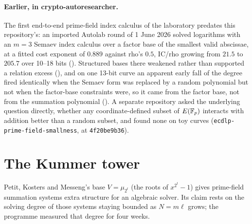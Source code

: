 \paragraph{Earlier, in crypto-autoresearcher.} The first end-to-end
prime-field index calculus of the laboratory predates this repository's:
an imported Autolab round of 1 June 2026 solved logarithms with an $m=3$
Semaev index calculus over a factor base of the smallest valid abscissae, at
a fitted cost exponent of $0.889$ against rho's $0.5$, IC/rho growing from
$21.5$ to $205.7$ over 10--18 bits ().
Structured bases there weakened rather than supported a relation excess
(), and on one 13-bit curve an
apparent early fall of the degree fired identically when the Semaev form
was replaced by a random polynomial but not when the factor-base
constraints were, so it came from the factor base, not from the summation
polynomial (). A separate repository asked the
underlying question directly, whether any coordinate-defined subset of
$E(\mathbb{F}_p)$ interacts with addition better than a random subset, and
found none on toy curves (\texttt{ecdlp-prime-field-smallness},
 at \texttt{4f20be9b36}).

\section{The Kummer tower}\label{sec:pkm}

Petit, Kosters and Messeng's base $V=\mu_{2^t}$ (the roots of
$x^{2^t}-1$) gives prime-field summation systems extra structure for an
algebraic solver. Its claim rests on the solving degree of those systems
staying bounded as $N=m\ell$ grows; the programme measured that degree for
four weeks.

